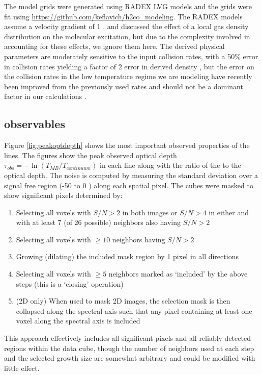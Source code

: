 The model grids were generated using RADEX LVG models
\citep[python wrapper \url{https://github.com/keflavich/pyradex/}; original
code][]{van-Der-Tak2007a} and the grids were fit using
\url{https://github.com/keflavich/h2co_modeling}.  The RADEX models
assume a velocity gradient of 1 \kms \perpc.  \citet{Ginsburg2011a} and
\citet{Ginsburg2013a}
discussed the effect of a local gas density distribution on the molecular
excitation, but due to the complexity involved in accounting for these effects,
we ignore them here.  The derived physical parameters are moderately
sensitive to the input collision rates, with a 50\% error in collision rates
yielding a factor of 2 error in derived density \citep{Zeiger2010a}, but the
error on the collision rates in the low temperature regime we are modeling have
recently been improved from the previously used \citet{Green1991a} rates and
should not be a dominant factor in our calculations
\citep{Troscompt2009a,Wiesenfeld2013a}.


\subsection{\formaldehyde observables}
\label{sec:h2co}

Figure \ref{fig:peakoptdepth} shows the most important observed properties of
the \formaldehyde lines.  The figures show the peak observed optical depth
$\tau_{obs} = -\ln(T_{MB}/T_{continuum})$ in each line along with the ratio of
the \oneone to the \twotwo optical depth.  The noise is computed by measuring
the standard deviation over a signal free region (-50 to 0 \kms) along each
spatial pixel.  The cubes were masked to show significant pixels determined by:
\begin{enumerate}
    \item Selecting all voxels with $S/N > 2$ in both images or $S/N > 4$ in
        either and with at least 7 (of 26 possible) neighbors also having $S/N > 2$ 
    \item Selecting all voxels with $\ge10$ neighbors having $S/N > 2$
    \item Growing (dilating) the included mask region by 1 pixel in all
        directions
    \item Selecting all voxels with $\ge5$ neighbors marked as `included' by the
        above steps (this is a `closing' operation)
    \item (2D only) When used to mask 2D images, the selection mask is then
        collapsed along the spectral axis such that any pixel containing at
        least one voxel along the spectral axis is included
\end{enumerate}
This approach effectively includes all significant pixels and all reliably
detected regions within the data cube, though the number of neighbors used at
each step and the selected growth size are somewhat arbitrary and could be
modified with little effect.

